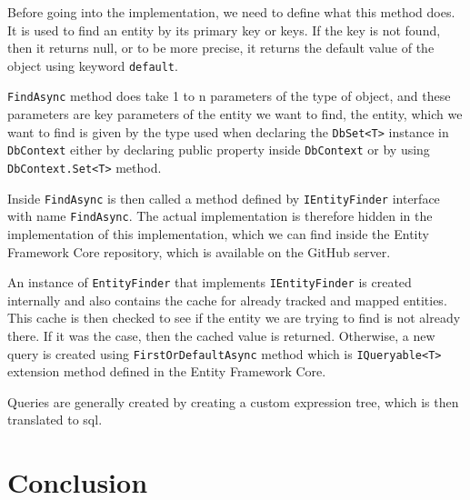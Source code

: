 Before going into the implementation, we need to define what this method does. It is used to find an entity by its primary key or keys.
If the key is not found, then it returns null, or to be more precise, it returns the default value of the object using keyword \texttt{default}.

\texttt{FindAsync} method does take 1 to n parameters of the type of object, and these parameters are key parameters of the entity we want to find, the entity,
which we want to find is given by the type used when declaring the \texttt{DbSet<T>} instance in \texttt{DbContext} either by declaring public property inside \texttt{DbContext}
or by using \texttt{DbContext.Set<T>} method.

Inside \texttt{FindAsync} is then called a method defined by \texttt{IEntityFinder} interface with name \texttt{FindAsync}.
The actual implementation is therefore hidden in the implementation of this implementation, which we can find inside the Entity Framework Core repository, which is available
on the GitHub server.

An instance of \texttt{EntityFinder} that implements \texttt{IEntityFinder} is created internally and also contains the cache for already tracked and mapped entities.
This cache is then checked to see if the entity we are trying to find is not already there. If it was the case, then the cached value is returned. Otherwise, a new query is created
using \texttt{FirstOrDefaultAsync} method which is \texttt{IQueryable<T>} extension method defined in the Entity Framework Core.

Queries are generally created by creating a custom expression tree, which is then translated to \acrshort{sql}.

\section {Conclusion}


